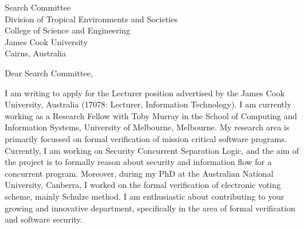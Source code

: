 \documentclass{letter}
\begin{document}
\begin{letter}{Search Committee\\
Division of Tropical Environments and Societies\\
College of Science and Engineering\\
James Cook University\\
Cairns, Australia}


\opening{Dear Search Committee,}


I am writing to apply for the Lecturer position advertised by the James Cook University, Australia  (17078: Lecturer, Information Technology). 
I am currently working as a Research Fellow with Toby Murray in the School of Computing and Information Systems, University 
of Melbourne, Melbourne. My research area is primarily focussed on formal verification of mission critical software programs.  
Currently, I am working  on Security Concurrent Separation Logic, and the aim of the project is 
 to formally reason about security and information flow for a concurrent program. Moreover, during my PhD at the Australian National 
 University, Canberra, I worked on the formal verification of electronic voting scheme, mainly Schulze method.  I am enthusiastic about 
 contributing to your growing and innovative department, specifically in the area of formal verification and software security. 
 

\end{letter}
\end{document}
